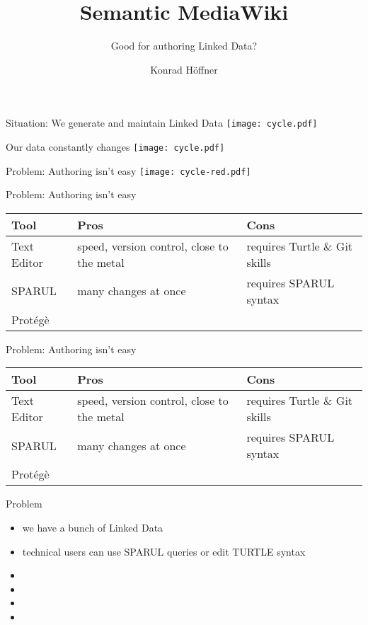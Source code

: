 \documentclass{beamer}
\title{Semantic MediaWiki}
\subtitle{Good for authoring Linked Data?}
\author{Konrad Höffner}
\begin{document}
\begin{frame}
\titlepage
\end{frame}

\begin{frame}{Situation: We generate and maintain Linked Data}
\centering
\texttt{[image: cycle.pdf]}
\end{frame}

\begin{frame}{Our data constantly changes}
\centering
\texttt{[image: cycle.pdf]}
\end{frame}

\begin{frame}{Problem: Authoring isn't easy}
\centering
\texttt{[image: cycle-red.pdf]}
\end{frame}

\begin{frame}{Problem: Authoring isn't easy}
\centering
\begin{tabulary}{\textwidth}{lLL}
\toprule
Tool		&Pros						&Cons\\
\midrule
Text Editor	&speed, version control, close to the metal	&requires Turtle \& Git skills\\
SPARUL		&many changes at once 				&requires SPARUL syntax\\
Prot\'eg\`e	&\\
\bottomrule
\end{tabulary}
\end{frame}

\begin{frame}{Problem: Authoring isn't easy}
\centering
\begin{tabulary}{\textwidth}{lLL}
\toprule
Tool		&Pros						&Cons\\
\midrule
Text Editor	&speed, version control, close to the metal	&requires Turtle \& Git skills\\
SPARUL		&many changes at once 				&requires SPARUL syntax\\
Prot\'eg\`e	&\\
\bottomrule
\end{tabulary}
\end{frame}

\begin{frame}{Problem}
\begin{itemize}
\item we have a bunch of Linked Data
\item technical users can use SPARUL queries or edit TURTLE syntax
\item 
\item 
\item 
\item 
\end{itemize}
\end{frame}
\end{document}
